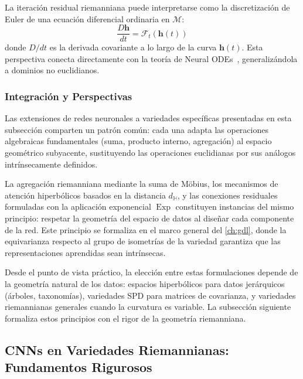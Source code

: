 \begin{remark}
La iteración residual riemanniana puede interpretarse como la discretización de Euler de una ecuación diferencial ordinaria en $\mathcal{M}$:
\begin{equation}
\frac{D\mathbf{h}}{dt} = \mathcal{F}_t(\mathbf{h}(t))
\end{equation}
donde $D/dt$ es la derivada covariante a lo largo de la curva $\mathbf{h}(t)$. Esta perspectiva conecta directamente con la teoría de Neural ODEs~\citep{chen2019neural}, generalizándola a dominios no euclidianos.
\end{remark}

\subsubsection{Integración y Perspectivas}

Las extensiones de redes neuronales a variedades específicas presentadas en esta subsección comparten un patrón común: cada una adapta las operaciones algebraicas fundamentales (suma, producto interno, agregación) al espacio geométrico subyacente, sustituyendo las operaciones euclidianas por sus análogos intrínsecamente definidos.

La agregación riemanniana mediante la suma de Möbius, los mecanismos de atención hiperbólicos basados en la distancia $d_{\mathbb{H}}$, y las conexiones residuales formuladas con la aplicación exponencial $\operatorname{Exp}$ constituyen instancias del mismo principio: respetar la geometría del espacio de datos al diseñar cada componente de la red. Este principio se formaliza en el marco general del \autoref{ch:gdl}, donde la equivarianza respecto al grupo de isometrías de la variedad garantiza que las representaciones aprendidas sean intrínsecas.

Desde el punto de vista práctico, la elección entre estas formulaciones depende de la geometría natural de los datos: espacios hiperbólicos para datos jerárquicos (árboles, taxonomías), variedades SPD para matrices de covarianza, y variedades riemannianas generales cuando la curvatura es variable. La subsección siguiente formaliza estos principios con el rigor de la geometría riemanniana.

\subsection{CNNs en Variedades Riemannianas: Fundamentos Rigurosos}

